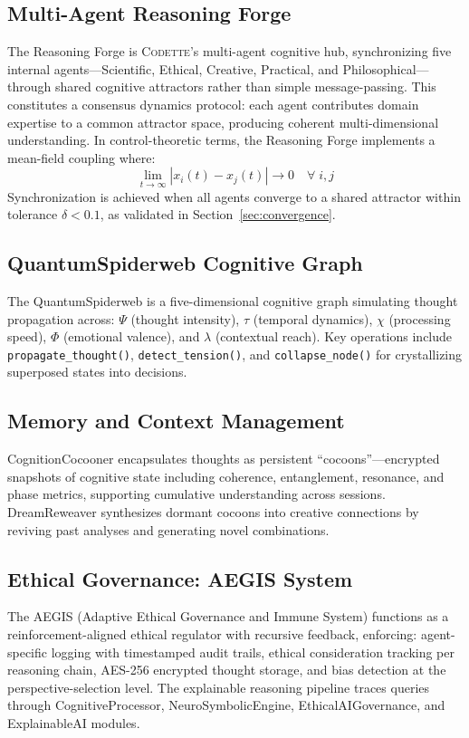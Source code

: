 \documentclass[11pt,a4paper]{article}
\newcommand{\codette}{\textsc{Codette}}
\begin{document}
\subsection{Multi-Agent Reasoning Forge}
The Reasoning Forge is \codette{}'s multi-agent cognitive hub, synchronizing five internal agents---Scientific, Ethical, Creative, Practical, and Philosophical---through shared cognitive attractors rather than simple message-passing. This constitutes a consensus dynamics protocol: each agent contributes domain expertise to a common attractor space, producing coherent multi-dimensional understanding. In control-theoretic terms, the Reasoning Forge implements a mean-field coupling where:
\begin{equation}
  \lim_{t \to \infty} |x_i(t) - x_j(t)| \to 0 \quad \forall\; i, j
  \label{eq:consensus}
\end{equation}
Synchronization is achieved when all agents converge to a shared attractor within tolerance $\delta < 0.1$, as validated in Section~\ref{sec:convergence}.

\subsection{QuantumSpiderweb Cognitive Graph}
The QuantumSpiderweb is a five-dimensional cognitive graph simulating thought propagation across: $\Psi$ (thought intensity), $\tau$ (temporal dynamics), $\chi$ (processing speed), $\Phi$ (emotional valence), and $\lambda$ (contextual reach). Key operations include \texttt{propagate\_thought()}, \texttt{detect\_tension()}, and \texttt{collapse\_node()} for crystallizing superposed states into decisions.

\subsection{Memory and Context Management}
CognitionCocooner encapsulates thoughts as persistent ``cocoons''---encrypted snapshots of cognitive state including coherence, entanglement, resonance, and phase metrics, supporting cumulative understanding across sessions. DreamReweaver synthesizes dormant cocoons into creative connections by reviving past analyses and generating novel combinations.

\subsection{Ethical Governance: AEGIS System}
The AEGIS (Adaptive Ethical Governance and Immune System) functions as a reinforcement-aligned ethical regulator with recursive feedback, enforcing: agent-specific logging with timestamped audit trails, ethical consideration tracking per reasoning chain, AES-256 encrypted thought storage, and bias detection at the perspective-selection level. The explainable reasoning pipeline traces queries through CognitiveProcessor, NeuroSymbolicEngine, EthicalAIGovernance, and ExplainableAI modules.
\end{document}
